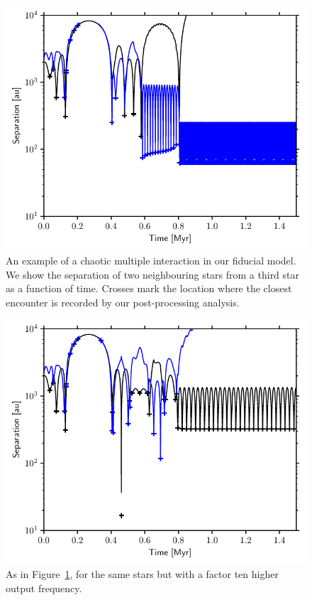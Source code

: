 \documentclass{aa}
\begin{document}
\begin{figure}
    \centering
    \includegraphics[width=\linewidth]{Figures/clustersim_enchist_17.pdf}
    \caption{An example of a chaotic multiple interaction in our fiducial model. We show the separation of two neighbouring stars from a third star as a function of time. Crosses mark the location where the closest encounter is recorded by our post-processing analysis.  }
    \label{fig:chaotic_fid}
\end{figure}
\begin{figure}
    \centering
    \includegraphics[width=\linewidth]{Figures/clustersim_enchist_17_highfreq.pdf}
    \caption{As in Figure~\ref{fig:chaotic_fid}, for the same stars  but with a factor ten higher output frequency.  }
    \label{fig:chaotic_hf}
\end{figure}
\end{document}

